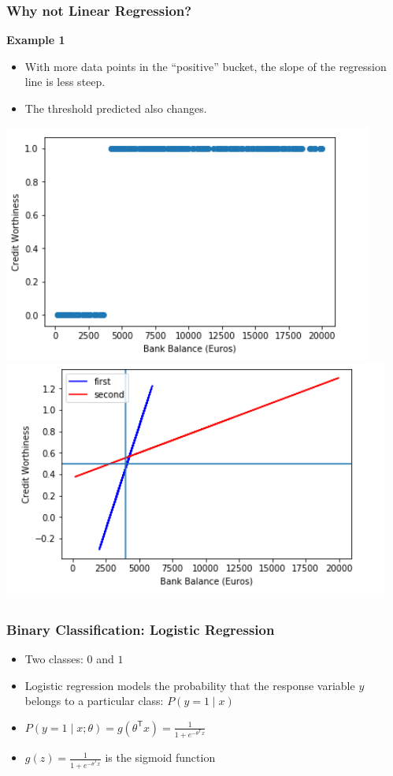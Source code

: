 \documentclass[xcolor=table]{beamer}
\newcommand{\trans}[1]{\ensuremath{#1}^{\scriptscriptstyle{\textsf{T}}}}
\begin{document}
\begin{frame}[t]
\frametitle{Why not Linear Regression?}
\textbf{Example 1}
\begin{itemize}
	\item With more data points in the ``positive'' bucket, the slope of the regression line is less steep.
	\item The threshold predicted also changes.
\end{itemize}
 
\includegraphics[scale=0.3]{bb_cw2.png}
\includegraphics[scale=0.3]{lin_reg_bb_cw2.png}
\end{frame}

\begin{frame}[t]
\frametitle{Binary Classification: Logistic Regression}

\begin{itemize}
    \item  Two classes: $0$ and $1$
    
    \item Logistic regression models the probability that the response
    variable $y$ belongs to a particular class: $P(y = 1 \mid x)$
    
    \item $P(y = 1 \mid x; \theta) = g(\trans{\theta} x) = \frac{1}{1 + e^{- \trans{\theta} x}}$
    
    \item $g(z) = \frac{1}{1 + e^{- \trans{\theta} x}}$ is the sigmoid function
\end{itemize}
\end{frame}
\end{document}
